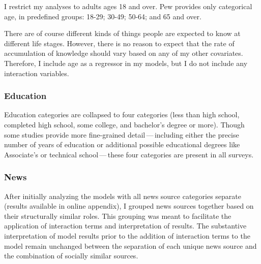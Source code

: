 \documentclass[11pt]{article}
\begin{document}
I restrict my analyses to adults ages 18 and over.  Pew provides only
categorical age, in predefined groups: 18-29; 30-49; 50-64; and 65 and over.


There are of course different kinds of things people are expected to know at
different life stages. However, there is no reason to expect that the rate of
accumulation of knowledge should vary based on any of my other covariates.
Therefore, I include age as a regressor in my models, but I do not include any
interaction variables.

\subsubsection{Education}\label{sec:ducation}

Education categories are collapsed to four categories (less than high school,
completed high school, some college, and bachelor's degree or more). Though some
studies provide more fine-grained detail\,---\,including either the precise number
of years of education or additional possible educational degrees like
Associate's or technical school\,---\,these four categories are present in all
surveys.



\subsubsection{News}
After initially analyzing the models with all news source categories separate
(results available in online appendix), I grouped news sources together based on
their structurally similar roles. This grouping was meant to facilitate the
application of interaction terms and interpretation of results. The substantive
interpretation of model results prior to the addition of interaction terms to
the model remain unchanged between the separation of each unique news source and
the combination of socially similar sources.
\end{document}
